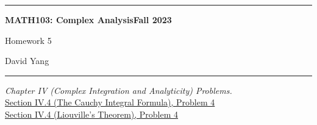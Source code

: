 \documentclass[11pt]{article}
\theoremstyle{definition}
\begin{document}
	\hrule
	\begin{center}
        \textbf{MATH103: Complex Analysis}\hfill \textbf{Fall 2023}\newline

		{\Large Homework 5}

		David Yang
	\end{center}

\hrule

\vspace{1em}


\textit{Chapter IV (Complex Integration and Analyticity) Problems.} \\

\underline{Section IV.4 (The Cauchy Integral Formula), Problem 4} \\

\underline{Section IV.4 (Liouville's Theorem), Problem 4} \\
\end{document}
